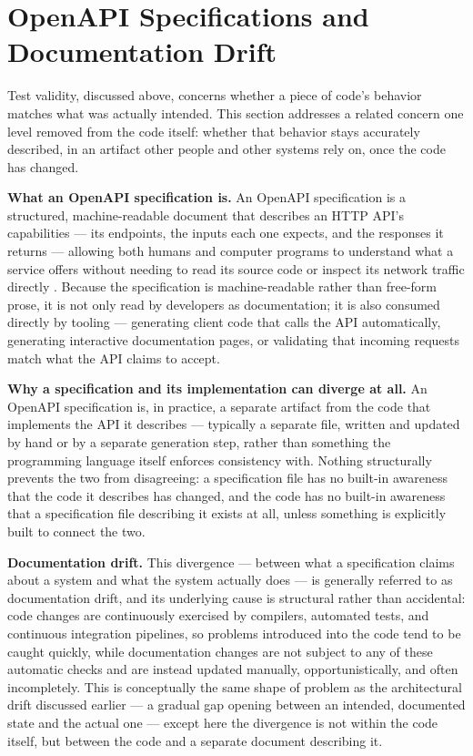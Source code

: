 \section{OpenAPI Specifications and Documentation Drift}

Test validity, discussed above, concerns whether a piece of code's behavior matches what was actually intended. This section addresses a related concern one level removed from the code itself: whether that behavior stays accurately described, in an artifact other people and other systems rely on, once the code has changed.

\textbf{What an OpenAPI specification is.} An OpenAPI specification is a structured, machine-readable document that describes an HTTP API's capabilities --- its endpoints, the inputs each one expects, and the responses it returns --- allowing both humans and computer programs to understand what a service offers without needing to read its source code or inspect its network traffic directly \cite{openapi2024what}. Because the specification is machine-readable rather than free-form prose, it is not only read by developers as documentation; it is also consumed directly by tooling --- generating client code that calls the API automatically, generating interactive documentation pages, or validating that incoming requests match what the API claims to accept.

\textbf{Why a specification and its implementation can diverge at all.} An OpenAPI specification is, in practice, a separate artifact from the code that implements the API it describes --- typically a separate file, written and updated by hand or by a separate generation step, rather than something the programming language itself enforces consistency with. Nothing structurally prevents the two from disagreeing: a specification file has no built-in awareness that the code it describes has changed, and the code has no built-in awareness that a specification file describing it exists at all, unless something is explicitly built to connect the two.

\textbf{Documentation drift.} This divergence --- between what a specification claims about a system and what the system actually does --- is generally referred to as documentation drift, and its underlying cause is structural rather than accidental: code changes are continuously exercised by compilers, automated tests, and continuous integration pipelines, so problems introduced into the code tend to be caught quickly, while documentation changes are not subject to any of these automatic checks and are instead updated manually, opportunistically, and often incompletely. This is conceptually the same shape of problem as the architectural drift discussed earlier --- a gradual gap opening between an intended, documented state and the actual one --- except here the divergence is not within the code itself, but between the code and a separate document describing it.

